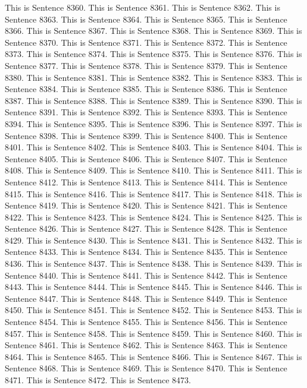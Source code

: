 \documentclass{article}
\begin{document}
This is Sentence 8360.
This is Sentence 8361.
This is Sentence 8362.
This is Sentence 8363.
This is Sentence 8364.
This is Sentence 8365.
This is Sentence 8366.
This is Sentence 8367.
This is Sentence 8368.
This is Sentence 8369.
This is Sentence 8370.
This is Sentence 8371.
This is Sentence 8372.
This is Sentence 8373.
This is Sentence 8374.
This is Sentence 8375.
This is Sentence 8376.
This is Sentence 8377.
This is Sentence 8378.
This is Sentence 8379.
This is Sentence 8380.
This is Sentence 8381.
This is Sentence 8382.
This is Sentence 8383.
This is Sentence 8384.
This is Sentence 8385.
This is Sentence 8386.
This is Sentence 8387.
This is Sentence 8388.
This is Sentence 8389.
This is Sentence 8390.
This is Sentence 8391.
This is Sentence 8392.
This is Sentence 8393.
This is Sentence 8394.
This is Sentence 8395.
This is Sentence 8396.
This is Sentence 8397.
This is Sentence 8398.
This is Sentence 8399.
This is Sentence 8400.
This is Sentence 8401.
This is Sentence 8402.
This is Sentence 8403.
This is Sentence 8404.
This is Sentence 8405.
This is Sentence 8406.
This is Sentence 8407.
This is Sentence 8408.
This is Sentence 8409.
This is Sentence 8410.
This is Sentence 8411.
This is Sentence 8412.
This is Sentence 8413.
This is Sentence 8414.
This is Sentence 8415.
This is Sentence 8416.
This is Sentence 8417.
This is Sentence 8418.
This is Sentence 8419.
This is Sentence 8420.
This is Sentence 8421.
This is Sentence 8422.
This is Sentence 8423.
This is Sentence 8424.
This is Sentence 8425.
This is Sentence 8426.
This is Sentence 8427.
This is Sentence 8428.
This is Sentence 8429.
This is Sentence 8430.
This is Sentence 8431.
This is Sentence 8432.
This is Sentence 8433.
This is Sentence 8434.
This is Sentence 8435.
This is Sentence 8436.
This is Sentence 8437.
This is Sentence 8438.
This is Sentence 8439.
This is Sentence 8440.
This is Sentence 8441.
This is Sentence 8442.
This is Sentence 8443.
This is Sentence 8444.
This is Sentence 8445.
This is Sentence 8446.
This is Sentence 8447.
This is Sentence 8448.
This is Sentence 8449.
This is Sentence 8450.
This is Sentence 8451.
This is Sentence 8452.
This is Sentence 8453.
This is Sentence 8454.
This is Sentence 8455.
This is Sentence 8456.
This is Sentence 8457.
This is Sentence 8458.
This is Sentence 8459.
This is Sentence 8460.
This is Sentence 8461.
This is Sentence 8462.
This is Sentence 8463.
This is Sentence 8464.
This is Sentence 8465.
This is Sentence 8466.
This is Sentence 8467.
This is Sentence 8468.
This is Sentence 8469.
This is Sentence 8470.
This is Sentence 8471.
This is Sentence 8472.
This is Sentence 8473.
\end{document}
